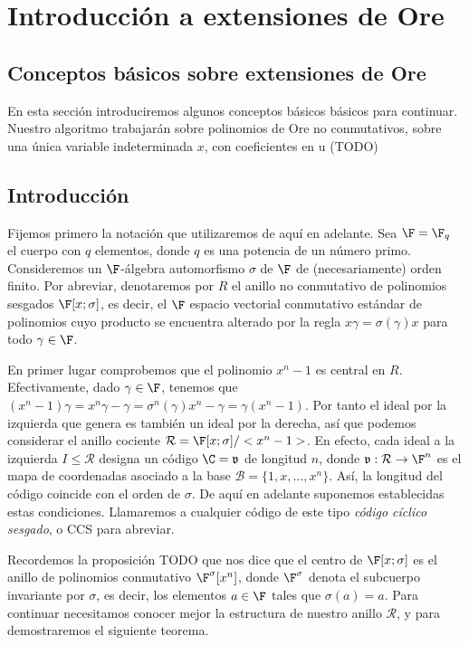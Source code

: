 \chapter{Introducción a extensiones de Ore}%
\label{chap:conceptos_básicos_sobre_códigos_lineales}

\section{Conceptos básicos sobre extensiones de Ore}
En esta sección introduciremos algunos conceptos básicos básicos para continuar. Nuestro algoritmo trabajarán sobre polinomios de Ore no conmutativos, sobre una única variable indeterminada \(x\), con coeficientes en u (TODO)

\section{Introducción}

Fijemos primero la notación que utilizaremos de aquí en adelante. Sea \(\F = \F_q\) el cuerpo con \(q\) elementos, donde \(q\) es una potencia de un número primo. Consideremos un \(\F\)-álgebra automorfismo \(\sigma\) de \(\F\) de (necesariamente) orden finito. Por abreviar, denotaremos por \(R\) el anillo no conmutativo de polinomios sesgados \(\F[x;\sigma]\), es decir, el \(\F\) espacio vectorial conmutativo estándar de polinomios cuyo producto se encuentra alterado por la regla \(x\gamma = \sigma(\gamma)x\) para todo  \(\gamma \in \F\).

En primer lugar comprobemos que el polinomio \(x^n -1\) es central en \(R\). Efectivamente, dado \(\gamma \in \F\), tenemos que \((x^n-1)\gamma= x^n \gamma - \gamma = \sigma^n(\gamma)x^n - \gamma = \gamma(x^n -1)\). Por tanto el ideal por la izquierda que genera es también un ideal por la derecha, así que podemos considerar el anillo cociente \(\mathcal{R} = \F[x;\sigma] / <x^n -1>\). En efecto, cada ideal a la izquierda \(I \leq \mathcal{R}\) designa un código \(\C =\mathfrak{v} \) de longitud  \(n\), donde  \(\mathfrak{v}:\mathcal{R} \rightarrow \F^n\) es el mapa de coordenadas asociado a la base \(\mathcal{B} = \{1, x, \dots, x^n\}\). Así, la longitud del código coincide con el orden de \(\sigma\). De aquí en adelante suponemos establecidas estas condiciones. Llamaremos a cualquier código de este tipo \textit{código cíclico sesgado}, o CCS para abreviar.

Recordemos la proposición TODO que nos dice que el centro de \(\F[x;\sigma]\) es el anillo de polinomios conmutativo  \(\F^\sigma[x^n]\), donde  \(\F^\sigma\) denota el subcuerpo invariante por  \(\sigma\), es decir, los elementos  \(a \in \F\) tales que  \(\sigma(a) = a\). Para continuar necesitamos conocer mejor la estructura de nuestro anillo \(\mathcal{R}\), y para demostraremos el siguiente teorema.

